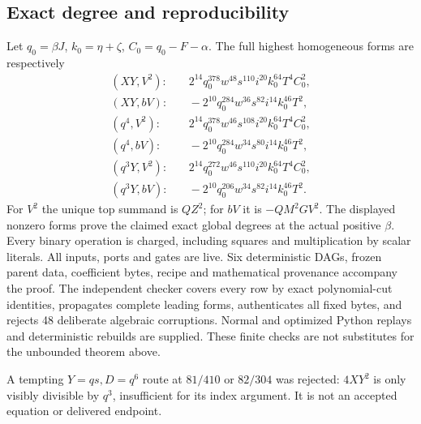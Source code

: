 \subsection{Exact degree and reproducibility}
Let $q_0=\beta J$, $k_0=\eta+\zeta$, $C_0=q_0-F-\alpha$.
The full highest homogeneous forms are respectively
\begin{align*}
 (XY,V^2):&\quad2^{14}q_0^{378}w^{48}s^{110}i^{20}k_0^{64}T^4C_0^2,\\
 (XY,bV):&\quad-2^{10}q_0^{284}w^{36}s^{82}i^{14}k_0^{46}T^2,\\
 (q^4,V^2):&\quad2^{14}q_0^{378}w^{46}s^{108}i^{20}k_0^{64}T^4C_0^2,\\
 (q^4,bV):&\quad-2^{10}q_0^{284}w^{34}s^{80}i^{14}k_0^{46}T^2,\\
 (q^3Y,V^2):&\quad2^{14}q_0^{272}w^{46}s^{110}i^{20}k_0^{64}T^4C_0^2,\\
 (q^3Y,bV):&\quad-2^{10}q_0^{206}w^{34}s^{82}i^{14}k_0^{46}T^2.
\end{align*}
For $V^2$ the unique top summand is $QZ^2$; for $bV$ it is
$-QM^2GV^2$. The displayed nonzero forms prove the claimed exact global
degrees at the actual positive $\beta$. Every binary operation is charged,
including squares and multiplication by scalar literals. All inputs,
ports and gates are live. Six deterministic DAGs, frozen parent data,
coefficient bytes, recipe and mathematical provenance accompany the proof.
The independent checker covers every row by exact polynomial-cut identities,
propagates complete leading forms, authenticates all fixed bytes, and rejects
48 deliberate algebraic corruptions. Normal and optimized Python replays
and deterministic rebuilds are supplied. These finite checks are not
substitutes for the unbounded theorem above.

A tempting $Y=qs,D=q^6$ route at $81/410$ or $82/304$ was rejected:
$4XY^2$ is only visibly divisible by $q^3$, insufficient for its index
argument. It is not an accepted equation or delivered endpoint.
